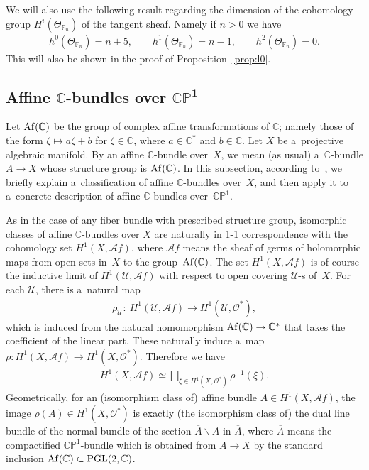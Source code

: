 We will also use the following result regarding the dimension of the cohomology group $H^i(\Theta_{\mathbb{F}_n})$ of
the tangent sheaf.
Namely if $n>0$ we have \cite{MKbook}
\begin{gather}
\label{cohohir}
h^0(\Theta_{\mathbb{F}_n}) = n + 5,
\qquad
h^1(\Theta_{\mathbb{F}_n}) = n - 1,
\qquad
h^2(\Theta_{\mathbb{F}_n}) = 0.
\end{gather}
This will also be shown in the proof of Proposition~\ref{prop:l0}.


\subsection[Af\/f\/ine $\mathbb{C}$-bundles over $\mathbb{CP}^1$]{Af\/f\/ine
$\boldsymbol{\mathbb{C}}$-bundles over $\boldsymbol{\mathbb{CP}^1}$}
\label{ss:ab}

Let ${\rm Af}(\mathbb{C})$ be the group of complex af\/f\/ine transformations of $\mathbb{C}$; namely those of the form
$\zeta\mapsto a\zeta + b$ for $\zeta\in \mathbb{C}$, where $a\in \mathbb{C}^*$ and $b\in \mathbb{C}$.
Let $X$ be a~projective algebraic manifold.
By an af\/f\/ine $\mathbb{C}$-bundle over~$X$, we mean (as usual) a~$\mathbb{C}$-bundle $A\to X$ whose structure group
is ${\rm {Af}}(\mathbb{C})$.
In this subsection, according to~\cite{At55}, we brief\/ly explain a~classif\/ication of af\/f\/ine $\mathbb{C}$-bundles
over~$X$, and then apply it to a~concrete description of af\/f\/ine $\mathbb{C}$-bundles over~$\mathbb{CP}^1$.

As in the case of any f\/iber bundle with prescribed structure group, isomorphic classes of af\/f\/ine
$\mathbb{C}$-bundles over $X$ are naturally in 1-1 correspondence with the cohomology set $H^1(X, \mathscr {A}f)$, where
$\mathscr {A}f$ means the sheaf of germs of holomorphic maps from open sets in~$X$ to the group~${\rm{Af}}(\mathbb{C})$.
The set $H^1(X, \mathscr {A}f)$ is of course the inductive limit of $H^1(\mathscr U,\mathscr Af)$ with respect to open
covering $\mathscr U$-s of~$X$.
For each $\mathscr U$, there is a~natural map
\begin{gather*}
\rho_{\mathscr U}: \ H^1(\mathscr U,{\mathscr A}f)
 \longrightarrow
H^1(\mathscr U,\mathscr O^*),
\end{gather*}
which is induced from the natural homomorphism $ {\rm {Af}}(\mathbb{C})\to \mathbb{C}^*$ that takes the coef\/f\/icient
of the linear part.
These naturally induce a~map $\rho:H^1(X, \mathscr Af)\to H^1(X,\mathscr O^*)$.
Therefore we have
\begin{gather}
\label{star1}
H^1(X,\mathscr Af) \simeq \bigsqcup_{\xi \in H^1(X,\mathscr O^*)}\rho^{-1}(\xi).
\end{gather}
Geometrically, for an (isomorphism class of) af\/f\/ine bundle $A\in H^1(X,\mathscr Af)$, the image $\rho(A)\in
H^1(X,\mathscr O^*)$ is exactly (the isomorphism class of) the dual line bundle of the normal bundle of the section
$\overline A \backslash A$ in $\overline A$, where $\overline A$ means the compactif\/ied $\mathbb{CP}^1$-bundle which
is obtained from $A\to X$ by the standard inclusion ${\rm Af}(\mathbb{C})\subset\mathrm{PGL}(2,\mathbb{C})$.

